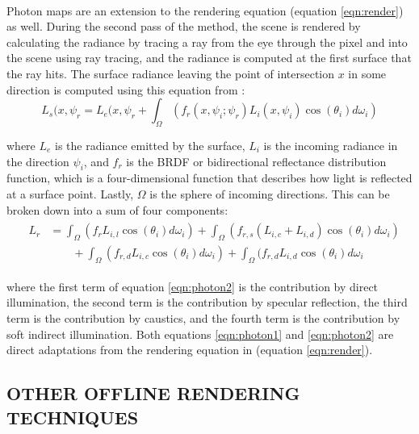 \paragraph{}
Photon maps are an extension to the rendering equation (equation \ref{eqn:render}) as well.  During the second pass of the method, the scene is rendered by calculating the radiance by tracing a ray from the eye through the pixel and into the scene using ray tracing, and the radiance is computed at the first surface that the ray hits.  The surface radiance leaving the point of intersection $x$ in some direction is computed using this equation from \cite{Jensen1996}:
\begin{equation}
L_{s}(x,\psi_{r} = L_{e}(x,\psi_{r} + \int_{\Omega}(f_{r}(x,\psi_{i};\psi_{r})L_{i}(x,\psi_{i})\cos(\theta_{i})d\omega_{i}) \label{eqn:photon1}
\end{equation}

where $L_{e}$ is the radiance emitted by the surface, $L_{i}$ is the incoming radiance in the direction $\psi_{i}$, and $f_{r}$ is the BRDF or bidirectional reflectance distribution function, which is a four-dimensional function that describes how light is reflected at a surface point.  Lastly, $\Omega$ is the sphere of incoming directions.  This can be broken down into a sum of four components:
\begin{align}
  &\begin{aligned} \label{eqn:photon2}
    L_{r} &=  \int_{\Omega} (f_{r}L_{i,l}\cos(\theta_{i})d\omega_{i}) + \int_{\Omega}(f_{r,s}(L_{i,c}+L_{i,d})\cos(\theta_{i})d\omega_{i})\\
      &\qquad + \int_{\Omega} (f_{r,d}L_{i,c}\cos(\theta_{i})d\omega_{i}) +  \int_{\Omega}(f_{r,d}L_{i,d}\cos(\theta_{i})d\omega_{i}
  \end{aligned}
\end{align}

where the first term of equation \ref{eqn:photon2} is the contribution by direct illumination, the second term is the contribution by specular reflection, the third term is the contribution by caustics, and the fourth term is the contribution by soft indirect illumination.  Both equations \ref{eqn:photon1} and \ref{eqn:photon2} are direct adaptations from the rendering equation in \cite{Kajiya1986} (equation \ref{eqn:render}).

\subsection{OTHER OFFLINE RENDERING TECHNIQUES} \label{sec:otheroffline}
